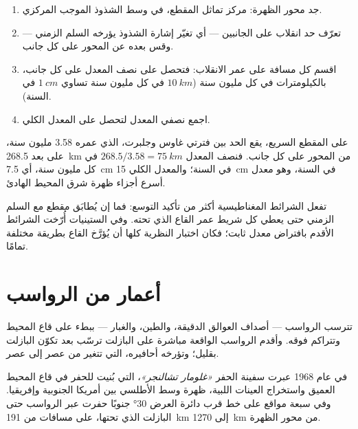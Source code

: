 \begin{method}\label{met:g11:drift-to-spreading:rate}
\begin{enumerate}
  \item جد محور الظهرة: مركز تماثل المقطع، في
        وسط الشذوذ الموجب المركزي.
  \item تعرّف حد انقلاب على الجانبين --- أي تغيّر إشارة
        الشذوذ يؤرخه السلم الزمني --- وقس بعده عن
        المحور على كل جانب.
  \item اقسم كل مسافة على عمر الانقلاب: فتحصل على نصف
        المعدل على كل جانب، بالكيلومترات في كل مليون سنة
        ($\qty{10}{km}$ في كل مليون سنة تساوي $\qty{1}{cm}$ في السنة).
  \item اجمع نصفي المعدل لتحصل على المعدل الكلي.
\end{enumerate}
\end{method}

\begin{example}\label{ex:g11:drift-to-spreading:fast}
على المقطع السريع، يقع الحد بين فترتي غاوس وجلبرت،
الذي عمره \num{3.58} مليون سنة، على بعد \qty{268.5}{km} من المحور على كل جانب.
فنصف المعدل $268.5/3.58 = \qty{75}{km}$ في كل مليون سنة، أي
\qty{7.5}{cm} في السنة؛ والمعدل الكلي \qty{15}{cm} في السنة، وهو معدل
أسرع أجزاء ظهرة شرق المحيط الهادئ.
\end{example}

تفعل الشرائط المغناطيسية أكثر من تأكيد التوسع: فما إن يُطابَق مقطع
مع السلم الزمني حتى يعطي كل شريط عمر القاع الذي تحته.
وفي الستينيات أُرّخت الشرائط الأقدم بافتراض معدل ثابت؛ فكان اختبار
النظرية كلها أن يُؤرَّخ القاع بطريقة مختلفة تمامًا.

\section{أعمار من الرواسب}

تترسب الرواسب --- أصداف العوالق الدقيقة، والطين، والغبار --- ببطء على
قاع المحيط وتتراكم فوقه. وأقدم الرواسب الواقعة مباشرة على
البازلت ترسّب بعد تكوّن البازلت بقليل؛ وتؤرخه أحافيره، التي
تتغير من عصر إلى عصر.

في عام 1968 عبرت سفينة الحفر \emph{«غلومار تشالنجر»}، التي بُنيت للحفر في
قاع المحيط العميق واستخراج العينات اللبية، ظهرة وسط الأطلسي بين
أمريكا الجنوبية وإفريقيا. وفي سبعة مواقع على خط قرب دائرة العرض
\ang{30} جنوبًا حفرت عبر الرواسب حتى البازلت الذي تحتها، على
مسافات من \qty{191}{km} إلى \qty{1270}{km} من محور الظهرة.

